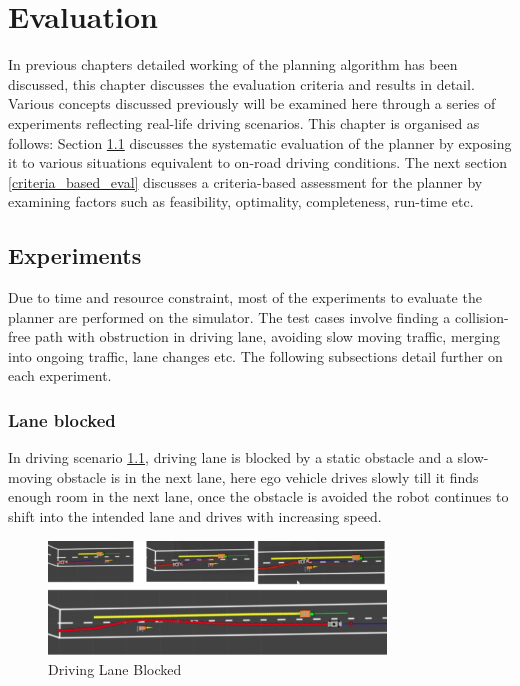 \chapter{Evaluation}
\label{evaluation}
In previous chapters detailed working of the planning algorithm has been discussed, this chapter discusses the evaluation criteria and results in detail. Various concepts discussed previously will be examined here through a series of experiments reflecting real-life driving scenarios. This chapter is organised as follows: Section \ref{experiments} discusses the systematic evaluation of the planner by exposing it to various situations equivalent to on-road driving conditions. The next section \ref{criteria_based_eval} discusses a criteria-based assessment for the planner by examining factors such as feasibility, optimality, completeness, run-time etc.

\section{Experiments}\label{experiments}
Due to time and resource constraint, most of the experiments to evaluate the planner are performed on the simulator. The test cases involve finding a collision-free path with obstruction in driving lane, avoiding slow moving traffic, merging into ongoing traffic, lane changes etc. The following subsections detail further on each experiment. 

\subsection{Lane blocked}
In driving scenario  \ref{lane_blocked_1}, driving lane is blocked by a static obstacle and a slow-moving obstacle is in the next lane, here ego vehicle drives slowly till it finds enough room in the next lane, once the obstacle is avoided the robot continues to shift into the intended lane and drives with increasing speed. 

\begin{figure}[h]
    \centering
    \includegraphics[width=0.8\textwidth]{Images/evaluation/lane_blocked1.jpg}
    \caption{Driving Lane Blocked}
    \label{lane_blocked_1}
\end{figure}

